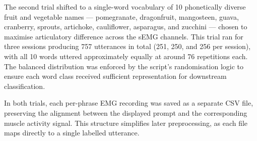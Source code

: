 The second trial shifted to a single-word vocabulary of 10 phonetically diverse fruit and vegetable names --- pomegranate, dragonfruit, mangosteen, guava, cranberry, sprouts, artichoke, cauliflower, asparagus, and zucchini --- chosen to maximise articulatory difference across the sEMG channels. This trial ran for three sessions producing 757 utterances in total (251, 250, and 256 per session), with all 10 words uttered approximately equally at around 76 repetitions each. The balanced distribution was enforced by the script's randomisation logic to ensure each word class received sufficient representation for downstream classification.

In both trials, each per-phrase EMG recording was saved as a separate CSV file, preserving the alignment between the displayed prompt and the corresponding muscle activity signal. This structure simplifies later preprocessing, as each file maps directly to a single labelled utterance.
